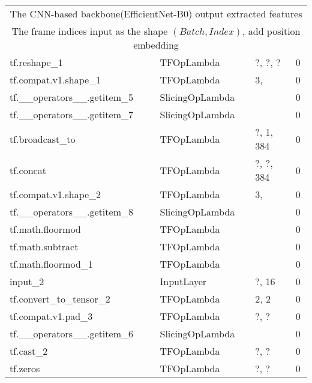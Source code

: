 \begin{longtable}{llll}
\midrule
\multicolumn{4}{c}{The CNN-based backbone(EfficientNet-B0) output extracted features} \\
\multicolumn{4}{c}{The frame indices input as the shape $(Batch, Index)$, add position embedding} \\ \midrule
              tf.reshape\_1 &         TFOpLambda &                       ?, ?, ? &        0 \\
       tf.compat.v1.shape\_1 &         TFOpLambda &                                     3, &        0 \\
 tf.\_\_operators\_\_.getitem\_5 &    SlicingOpLambda &                                        &        0 \\
 tf.\_\_operators\_\_.getitem\_7 &    SlicingOpLambda &                                        &        0 \\
            tf.broadcast\_to &         TFOpLambda &                           ?, 1, 384 &        0 \\
                  tf.concat &         TFOpLambda &                        ?, ?, 384 &        0 \\
       tf.compat.v1.shape\_2 &         TFOpLambda &                                     3, &        0 \\
 tf.\_\_operators\_\_.getitem\_8 &    SlicingOpLambda &                                        &        0 \\
           tf.math.floormod &         TFOpLambda &                                        &        0 \\
           tf.math.subtract &         TFOpLambda &                                        &        0 \\
         tf.math.floormod\_1 &         TFOpLambda &                                        &        0 \\
                    input\_2 &         InputLayer &                             ?, 16 &        0 \\
     tf.convert\_to\_tensor\_2 &         TFOpLambda &                                   2, 2 &        0 \\
         tf.compat.v1.pad\_3 &         TFOpLambda &                             ?, ? &        0 \\
 tf.\_\_operators\_\_.getitem\_6 &    SlicingOpLambda &                                        &        0 \\
                  tf.cast\_2 &         TFOpLambda &                             ?, ? &        0 \\
                   tf.zeros &         TFOpLambda &                             ?, ? &        0 \\

\end{longtable}
